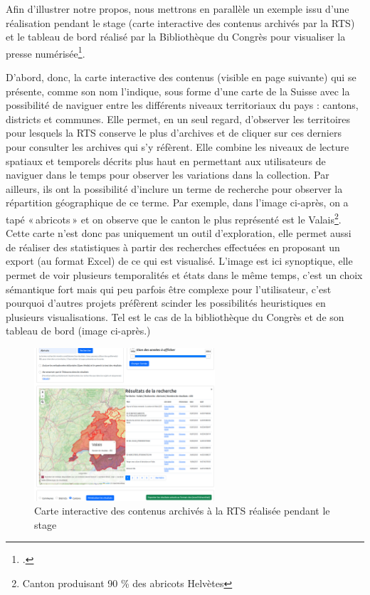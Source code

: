 Afin d’illustrer notre propos, nous mettrons en parallèle un exemple issu d’une réalisation pendant le stage (carte interactive des contenus archivés par la RTS) et le tableau de bord réalisé par la Bibliothèque du Congrès pour visualiser la presse numérisée\footcite[tableau de bord accessible en suivant l'url suivante \url{https://public.tableau.com/app/profile/chronicling.america/viz/ChroniclingAmericaTemporalCoveragebyStateMap/TemporalStateCoverage}]{noauthor_chronicling_nodate}.

D’abord, donc, la carte interactive des contenus (visible en page suivante) qui se présente, comme son nom l’indique, sous forme d’une carte de la Suisse avec la possibilité de naviguer entre les différents niveaux territoriaux du pays : cantons, districts et communes. Elle permet, en un seul regard, d’observer les territoires pour lesquels la RTS conserve le plus d’archives et de cliquer sur ces derniers pour consulter les archives qui s’y réfèrent. Elle combine les niveaux de lecture spatiaux et temporels décrits plus haut en permettant aux utilisateurs de naviguer dans le temps pour observer les variations dans la collection. Par ailleurs, ils ont la possibilité d’inclure un terme de recherche pour observer la répartition géographique de ce terme. Par exemple, dans l’image ci-après, on a tapé « abricots » et on observe que le canton le plus représenté est le Valais\footnote{Canton produisant 90 \% des abricots Helvètes}. Cette carte n’est donc pas uniquement un outil d’exploration, elle permet aussi de réaliser des statistiques à partir des recherches effectuées en proposant un export (au format Excel) de ce qui est visualisé. L'image est ici synoptique, elle permet de voir plusieurs temporalités et états dans le même temps, c'est un choix sémantique fort mais qui peu parfois être complexe pour l'utilisateur, c'est pourquoi d'autres projets préfèrent scinder les possibilités heuristiques en plusieurs visualisations. Tel est le cas de la bibliothèque du Congrès et de son tableau de bord (image ci-après.)



\begin{figure}[h!]
	\centering
	\includegraphics[width=0.6\textwidth]{images/image14.png}
	\caption{Carte interactive des contenus archivés à la RTS réalisée pendant le stage}
	\label{fig:image14}
\end{figure}


